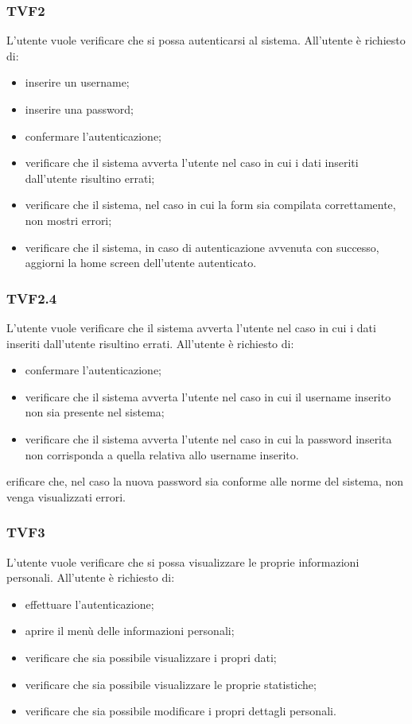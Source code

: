 		\subsubsection{TVF2}
			L'utente vuole verificare che si possa autenticarsi al sistema. All'utente è richiesto di:
			\begin{itemize}
				\item inserire un username;
				\item inserire una password;
				\item confermare l'autenticazione;
				\item verificare che il sistema avverta l'utente nel caso in cui i dati inseriti dall'utente risultino errati;
				\item verificare che il sistema, nel caso in cui la form sia compilata correttamente, non mostri errori;
				\item verificare che il sistema, in caso di autenticazione avvenuta con successo, aggiorni la home screen dell'utente autenticato.
			\end{itemize}
			
		\subsubsection{TVF2.4}
			L'utente vuole verificare che il sistema avverta l'utente nel caso in cui i dati inseriti dall'utente risultino errati. All'utente è richiesto di:
			\begin{itemize}
				\item confermare l'autenticazione;
				\item verificare che il sistema avverta l'utente nel caso in cui il username inserito non sia presente nel sistema;
				\item verificare che il sistema avverta l'utente nel caso in cui la password inserita non corrisponda a quella relativa allo username inserito.
			\end{itemize}erificare che, nel caso la nuova password sia conforme alle norme del sistema, non venga visualizzati errori.
			
		\subsubsection{TVF3}
			L'utente vuole verificare che si possa visualizzare le proprie informazioni personali. All'utente è richiesto di:
			\begin{itemize}
				\item effettuare l'autenticazione;
				\item aprire il menù delle informazioni personali;
				\item verificare che sia possibile visualizzare i propri dati;
				\item verificare che sia possibile visualizzare le proprie statistiche;
				\item verificare che sia possibile modificare i propri dettagli personali.
			\end{itemize}
			
